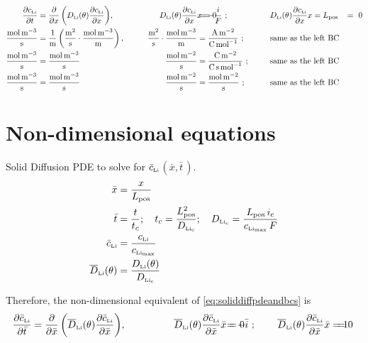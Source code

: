 \documentclass{article}
\newcommand{\cLi}{\ensuremath{c_{\mathchoice{}{}{\scriptscriptstyle}{} \mathrm{L}\mathrm{i}}}}
\newcommand{\cLimax}{\ensuremath{c_{\mathchoice{}{}{\scriptscriptstyle}{} \mathrm{L}\mathrm{i}_\text{max}}}}
\newcommand{\DLi}{\ensuremath{D_{\mathchoice{}{}{\scriptscriptstyle}{} \mathrm{L}\mathrm{i}}}}
\newcommand{\DLichar}{\ensuremath{D_{\mathchoice{}{}{\scriptscriptstyle}{} \mathrm{L}\mathrm{i}_\text{c}}}}
\newcommand{\cbarLi}{\ensuremath{\bar{c}_{\mathchoice{}{}{\scriptscriptstyle}{} \mathrm{L}\mathrm{i}}}}
\newcommand{\DbarLi}{\ensuremath{\overline{D}_{\mathchoice{}{}{\scriptscriptstyle}{} \mathrm{L}\mathrm{i}}}}
\newcommand{\xbar}{\ensuremath{\bar{x}}}
\newcommand{\tbar}{\ensuremath{\bar{t}}}
\begin{document}
\begin{alignat}{4}
    \diffp{\cLi}{t} &= \diffp*{\left(\DLi(\theta)\diffp{\cLi}{x}\right)}{x},  &\qquad \DLi(\theta)\diffp{\cLi}{x}{\mathrlap{x=0}}&= -\frac{i}{F}\  ; \qquad\qquad &&\  \DLi(\theta)\diffp{\cLi}{x}{\mathrlap{x=L_\text{pos}}} \ &= \ 0 \label{eq:soliddiffpdeandbcs}\\
    \frac{\si{\mol\per\metre\cubed}}{\si{\second}} &= \frac{1}{\si{\metre}} \left(\frac{\si{\meter\squared}}{\si{\second}}\cdot \frac{\si{\mol\per\metre\cubed}}{\si{\metre}}\right), &\qquad   \frac{\si{\meter\squared}}{\si{\second}}\cdot \frac{\si{\mol\per\metre\cubed}}{\si{\metre}} &= \frac{\si{\ampere\per\metre\squared}}{\si{\coulomb\per\mol}}\ ; &&\ \text{same as the left BC} \\
    \frac{\si{\mol\per\metre\cubed}}{\si{\second}} &= \frac{\si{\mol\per\metre\cubed}}{\si{\second}} &\qquad    \frac{\si{\mol\per\metre\squared}}{\si{\second}} &= \frac{\si{\coulomb\per\metre\squared}}{\si{\coulomb\second\per\mol}}\ ; &&\ \text{same as the left BC} \\
    \frac{\si{\mol\per\metre\cubed}}{\si{\second}} &= \frac{\si{\mol\per\metre\cubed}}{\si{\second}} &\qquad    \frac{\si{\mol\per\metre\squared}}{\si{\second}} &= \frac{\si{\mol\per\metre\squared}}{\si{\second}}\ ; &&\ \text{same as the left BC}
\end{alignat}

\section*{Non-dimensional equations}
Solid Diffusion PDE to solve for \cbarLi$(\xbar,\tbar\,)$.
\begin{align}
    \xbar &= \frac{x}{L_\text{pos}}\\
    \tbar &= \frac{t}{t_c}; \quad t_c = \frac{L^2_\text{pos}}{\DLichar}; \quad \DLichar = \frac{L_\text{pos} \,i_\text{c}}{\cLimax \, F}\\
    \cbarLi &= \frac{\cLi}{\cLimax} \\
    \DbarLi(\theta) &= \frac{\DLi(\theta)}{\DLichar}
\end{align}

Therefore, the non-dimensional equivalent of \eqref{eq:soliddiffpdeandbcs} is
\begin{alignat}{4}
    \diffp{\cbarLi}{\tbar} &= \diffp*{\left(\DbarLi(\theta)\diffp{\cbarLi}{\xbar}\right)}{\xbar},  &\qquad\qquad \DbarLi(\theta)\diffp{\cbarLi}{\xbar}{\mathrlap{\xbar=0}}\ &= -\bar{i}\  ; \quad &&\  \DbarLi(\theta)\diffp{\cbarLi}{\xbar}{\mathrlap{\xbar=1}}\ &= 0\
\end{alignat}
\end{document}
